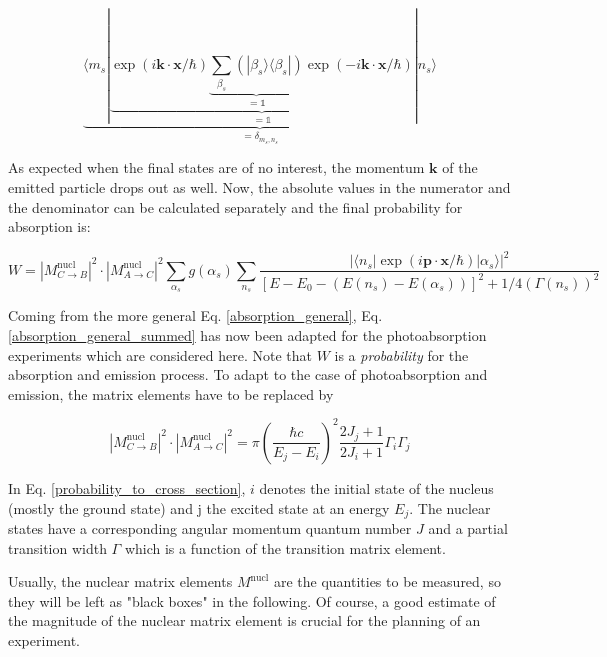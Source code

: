 \documentclass{article}
\begin{document}
\begin{equation}
	\label{absorption_simplification_4}
	\underbrace{\langle m_s | \underbrace{\exp{\left( i \mathbf{k} \cdot \mathbf{x} / \hbar \right)} \underbrace{\sum_{\beta_s} \left( | \beta_s \rangle \langle \beta_s | \right)}_{ = \mathbb{1}} \exp{\left( - i \mathbf{k} \cdot \mathbf{x} / \hbar \right)} }_{ = \mathbb{1}} | n_s \rangle }_{ = \delta_{m_s, n_s}}
\end{equation}

As expected when the final states are of no interest, the momentum $\mathbf{k}$ of the emitted particle drops out as well. 
Now, the absolute values in the numerator and the denominator can be calculated separately and the final probability for absorption is:

\begin{equation}
\label{absorption_general_summed}
	W = \left| M^{\mathrm{nucl}}_{C \to B} \right|^2 \cdot \left| M^{\mathrm{nucl}}_{A \to C} \right|^2 \sum_{\alpha_s} g(\alpha_s) \sum_{n_s} \frac{ \left| \langle n_s | \exp{\left( i \mathbf{p} \cdot \mathbf{x} / \hbar \right)} | \alpha_s \rangle \right|^2  }{\left[ E - E_0 - \left( E(n_s) - E(\alpha_s) \right) \right]^2 + 1/4 \left( \Gamma(n_s) \right)^2 }
\end{equation}

Coming from the more general Eq. \ref{absorption_general}, Eq. \ref{absorption_general_summed} has now been adapted for the photoabsorption experiments which are considered here.
Note that $W$ is a \textit{probability} for the absorption and emission process. To adapt to the case of photoabsorption and emission, the matrix elements have to be replaced by \cite{Bet37}

\begin{equation}
	\label{probability_to_cross_section}
	\left| M^{\mathrm{nucl}}_{C \to B} \right|^2 \cdot \left| M^{\mathrm{nucl}}_{A \to C} \right|^2 = \pi \left( \frac{\hbar c}{E_j - E_i} \right)^2 \frac{2 J_j + 1}{2 J_i + 1} \Gamma_i \Gamma_j
\end{equation}

In Eq. \ref{probability_to_cross_section}, $i$ denotes the initial state of the nucleus (mostly the ground state) and j the excited state at an energy $E_j$. The nuclear states have a corresponding angular momentum quantum number $J$ and a partial transition width $\Gamma$ which is a function of the transition matrix element.

Usually, the nuclear matrix elements $M^{\mathrm{nucl}}$ are the quantities to be measured, so they will be left as "black boxes" in the following. 
Of course, a good estimate of the magnitude of the nuclear matrix element is crucial for the planning of an experiment.
\end{document}
